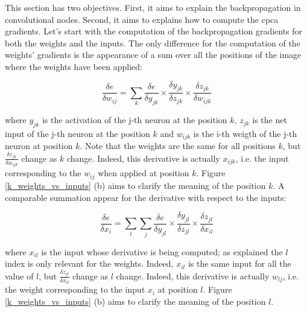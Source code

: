 \documentclass[11pt]{report}
\begin{document}
This section has two objectives. First, it aims to explain the backpropagation in convolutional nodes. Second, it aims to explains how to compute the \acrshort{cpca} gradients. Let's start with the computation of the backpropagation gradients for both the weights and the inputs. The only difference for the computation of the weights' gradients is the appearance of a sum over all the positions of the image where the weights have been applied:

\begin{equation} \label{eq:dwc2d}
\frac{\delta e}{\delta w_{ij}} = \sum_{k} \frac{\delta e}{\delta y_{jk}} \times \frac{\delta y_{jk}}{\delta z_{jk}} \times \frac{\delta z_{jk}}{\delta w_{ijk}}
\end{equation}

\noindent where $y_{jk}$ is the activation of the j-th neuron at the position $k$, $z_{jk}$ is the net input of the j-th neuron at the position $k$ and $w_{ijk}$ is the i-th weigth of the j-th neuron at position $k$. Note that the weights are the same for all positions $k$, but $\frac{\delta z_{jk}}{\delta w_{ijk}}$ change as $k$ change. Indeed, this derivative is actually $x_{ijk}$, i.e. the input corresponding to the $w_{ij}$ when applied at position $k$. Figure \ref{k_weights_vs_inputs} (b) aims to clarify the meaning of the position $k$. A comparable summation appear for the derivative with respect to the inputs:

\begin{equation}
\frac{\delta e}{\delta x_{i}} = \sum_{l} \sum_{j} \frac{\delta e}{\delta y_{jl}} \times \frac{\delta y_{jl}}{\delta z_{jl}} \times \frac{\delta z_{jl}}{\delta x_{il}}
\end{equation}

\noindent where $x_{il}$ is the input whose derivative is being computed; as explained the $l$ index is only relevant for the weights. Indeed, $x_{il}$ is the same input for all the value of $l$, but $\frac{\delta z_{jl}}{\delta x_{il}}$ change as $l$ change. Indeed, this derivative is actually $w_{lj}$, i.e. the weight corresponding to the input $x_{i}$ at position $l$. Figure \ref{k_weights_vs_inputs} (b) aims to clarify the meaning of the position $l$.
\end{document}
